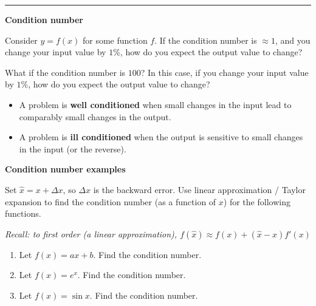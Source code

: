 \documentclass[12pt,letterpaper,noanswers]{exam}
\begin{document}
\vspace{0.2cm}
\hrule
\vspace{0.2cm}

\noindent \textbf{Condition number}

Consider $y = f(x)$ for some function $f$.  If the condition number is $\approx 1$, and you change your input value by $1\%$, how do you expect the output value to change?

\vspace{0.5in}


What if the condition number is $100$?  In this case, if you change your input value by $1\%$, how do you expect the output value to change?

\vspace{0.5in}


\begin{tcolorbox}
\begin{itemize}
\itemsep0pt
\item A problem is \textbf{well conditioned} when small changes in the input lead to comparably small changes in the output.

\item A problem is \textbf{ill conditioned} when the output is sensitive to small changes in the input (or the reverse).
\end{itemize}

\end{tcolorbox}


\noindent \textbf{Condition number examples}

Set $\hat{x} = x+ \Delta x$, so $\Delta x$ is the backward error.  Use linear approximation / Taylor expansion to find the condition number (as a function of $x$) for the following functions.

\emph{Recall: to first order (a linear approximation), $f(\hat{x}) \approx f(x) + (\hat{x} - x)f'(x)$}

\begin{enumerate}
    \item   Let $f(x) = ax + b$.  Find the condition number.
    \vspace{0.5in}
    
    \item Let $f(x) = e^x$.  Find the condition number.
        \vspace{1in}
    
     \item Let $f(x) = \sin x$.  Find the condition number.
         \vspace{1in}

\end{enumerate}
\end{document}
